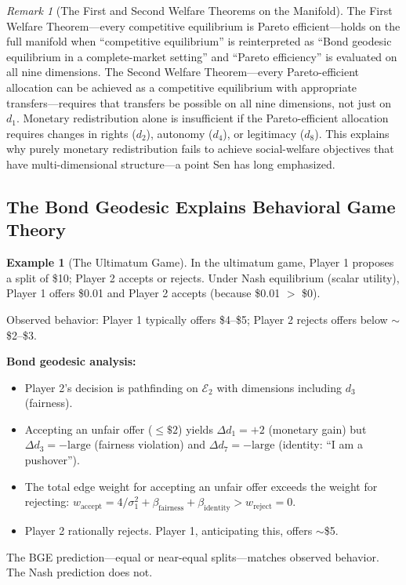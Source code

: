 \documentclass[12pt]{article}
\theoremstyle{definition}
\newtheorem{example}[theorem]{Example}
\theoremstyle{remark}
\newtheorem{remark}[theorem]{Remark}
\newcommand{\E}{\mathcal{E}}               %
\begin{document}
\begin{remark}[The First and Second Welfare Theorems on the Manifold]
The First Welfare Theorem---every competitive equilibrium is Pareto efficient---holds on the full manifold when ``competitive equilibrium'' is reinterpreted as ``Bond geodesic equilibrium in a complete-market setting'' and ``Pareto efficiency'' is evaluated on all nine dimensions.  The Second Welfare Theorem---every Pareto-efficient allocation can be achieved as a competitive equilibrium with appropriate transfers---requires that transfers be possible on all nine dimensions, not just on $d_1$.  Monetary redistribution alone is insufficient if the Pareto-efficient allocation requires changes in rights ($d_2$), autonomy ($d_4$), or legitimacy ($d_8$).  This explains why purely monetary redistribution fails to achieve social-welfare objectives that have multi-dimensional structure---a point Sen \cite{sen1999} has long emphasized.
\end{remark}

\subsection{The Bond Geodesic Explains Behavioral Game Theory}

\begin{example}[The Ultimatum Game]
\label{ex:ultimatum}
In the ultimatum game, Player 1 proposes a split of \$10; Player 2 accepts or rejects.  Under Nash equilibrium (scalar utility), Player 1 offers \$0.01 and Player 2 accepts (because \$0.01 $>$ \$0).

Observed behavior: Player 1 typically offers \$4--\$5; Player 2 rejects offers below $\sim$\$2--\$3.

\textbf{Bond geodesic analysis:}
\begin{itemize}
    \item Player 2's decision is pathfinding on $\E_2$ with dimensions including $d_3$ (fairness).
    \item Accepting an unfair offer ($\leq \$2$) yields $\Delta d_1 = +2$ (monetary gain) but $\Delta d_3 = -\text{large}$ (fairness violation) and $\Delta d_7 = -\text{large}$ (identity: ``I am a pushover'').
    \item The total edge weight for accepting an unfair offer exceeds the weight for rejecting: $w_{\text{accept}} = 4/\sigma_1^2 + \beta_{\text{fairness}} + \beta_{\text{identity}} > w_{\text{reject}} = 0$.
    \item Player 2 rationally rejects.  Player 1, anticipating this, offers $\sim$\$5.
\end{itemize}
The BGE prediction---equal or near-equal splits---matches observed behavior.  The Nash prediction does not.
\end{example}
\end{document}
